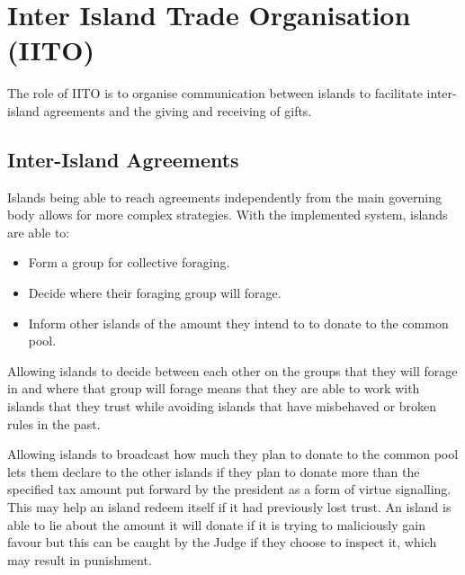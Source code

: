 \chapter{Inter Island Trade Organisation (IITO)}

The role of IITO is to organise communication between islands to facilitate inter-island agreements and the giving and receiving of gifts.  

\section{Inter-Island Agreements}  
\label{sec:IITO:inter_island_agreements}  


Islands being able to reach agreements independently from the main governing body allows for more complex strategies. With the implemented system, islands are able to:

\begin{itemize}
    \item Form a group for collective foraging.
    \item Decide where their foraging group will forage.
    \item Inform other islands of the amount they intend to to donate to the common pool.
\end{itemize}

Allowing islands to decide between each other on the groups that they will forage in and where that group will forage means that they are able to work with islands that they trust while avoiding islands that have misbehaved or broken rules in the past.


Allowing islands to broadcast how much they plan to donate to the common pool lets them declare to the other islands if they plan to donate more than the specified tax amount put forward by the president as a form of virtue signalling. This may help an island redeem itself if it had previously lost trust. An island is able to lie about the amount it will donate if it is trying to maliciously gain favour but this can be caught by the Judge if they choose to inspect it, which may result in punishment.

